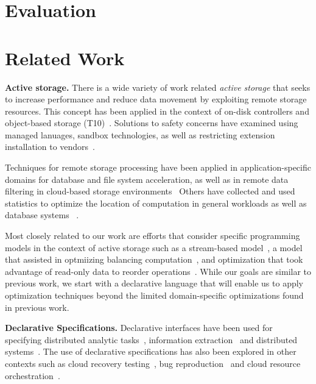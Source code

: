 \documentclass[10pt,twocolumn]{article}
\begin{document}
\section{Evaluation}

\section{Related Work}

{\bf Active storage.}
There is a wide variety of work related \emph{active storage} that seeks to
increase performance and reduce data movement by exploiting remote storage
resources. This concept has been applied in the context of on-disk
controllers and object-based storage
(T10)~\cite{riedel:vldb98,du:nwesp05,xie:msst11}.  Solutions to safety
concerns have examined using managed lanuages, sandbox technologies, as well
as restricting extension installation to
vendors~\cite{john:hiperio08,xie:msst11,runde:msst12}.

Techniques for remote storage processing have been applied in
application-specific domains for database and file system acceleration, as
well as in remote data filtering in cloud-based storage
environments~\cite{uysal:hpca00,chiu:iccs03,lim:msst08,gkantsidis:nsdi13}
Others have collected and used statistics to optimize the location of
computation in general workloads as well as database systems
~\cite{chen:cluster12,chen:icpp12,qiao:icde08}.

Most closely related to our work are efforts that consider specific
programming models in the context of active storage such as a stream-based
model~\cite{acharya:asplos98}, a model that assisted in optmiizing balancing
computation~\cite{wickremesinghe:hpdc022}, and optimization that took
advantage of read-only data to reorder operations~\cite{huston:fast04}.
While our goals are similar to previous work, we start with a declarative
language that will enable us to apply optimization techniques beyond
the limited domain-specific optimizations found in previous work.

{\bf Declarative Specifications.}
Declarative interfaces have been used for specifying distributed analytic 
tasks~\cite{olston_pig_2008,thusoo_hive_2010}, information 
extraction~\cite{shen_declarative_2007} and distributed 
systems~\cite{conway_logic_2012,bauer_legion_2014}. The use of declarative 
specifications has also been explored in other contexts such as cloud recovery 
testing~\cite{gunawi_fate_2011}, bug reproduction~\cite{li_reprolite_2014} and 
cloud resource orchestration~\cite{liu_declarative_2011}.
\end{document}
